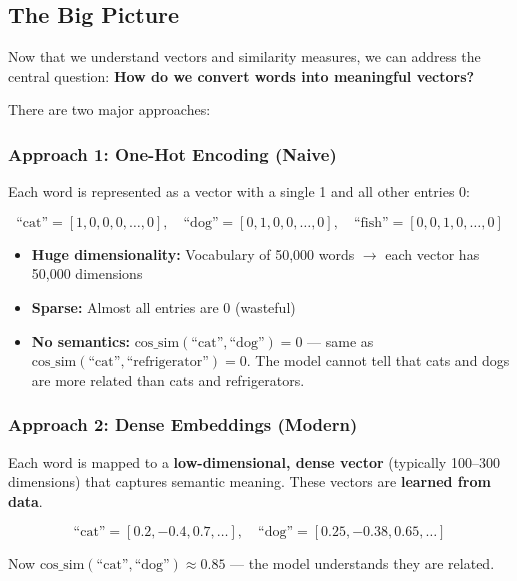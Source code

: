 \documentclass[11pt,a4paper]{article}
\begin{document}
\subsection{The Big Picture}

Now that we understand vectors and similarity measures, we can address the central question: \textbf{How do we convert words into meaningful vectors?}

There are two major approaches:

\subsubsection*{Approach 1: One-Hot Encoding (Naive)}

Each word is represented as a vector with a single 1 and all other entries 0:

\[
\text{``cat''} = [1, 0, 0, 0, \ldots, 0], \quad \text{``dog''} = [0, 1, 0, 0, \ldots, 0], \quad \text{``fish''} = [0, 0, 1, 0, \ldots, 0]
\]

\begin{tcolorbox}[warnbox={Problems with One-Hot Encoding}]
\begin{itemize}[leftmargin=1em, itemsep=2pt]
    \item \textbf{Huge dimensionality:} Vocabulary of 50{,}000 words $\to$ each vector has 50{,}000 dimensions
    \item \textbf{Sparse:} Almost all entries are 0 (wasteful)
    \item \textbf{No semantics:} $\text{cos\_sim}(\text{``cat''}, \text{``dog''}) = 0$ --- same as $\text{cos\_sim}(\text{``cat''}, \text{``refrigerator''}) = 0$. The model cannot tell that cats and dogs are more related than cats and refrigerators.
\end{itemize}
\end{tcolorbox}

\subsubsection*{Approach 2: Dense Embeddings (Modern)}

Each word is mapped to a \textbf{low-dimensional, dense vector} (typically 100--300 dimensions) that captures semantic meaning. These vectors are \textbf{learned from data}.

\[
\text{``cat''} = [0.2, -0.4, 0.7, \ldots], \quad \text{``dog''} = [0.25, -0.38, 0.65, \ldots]
\]

Now $\text{cos\_sim}(\text{``cat''}, \text{``dog''}) \approx 0.85$ --- the model understands they are related.
\end{document}

